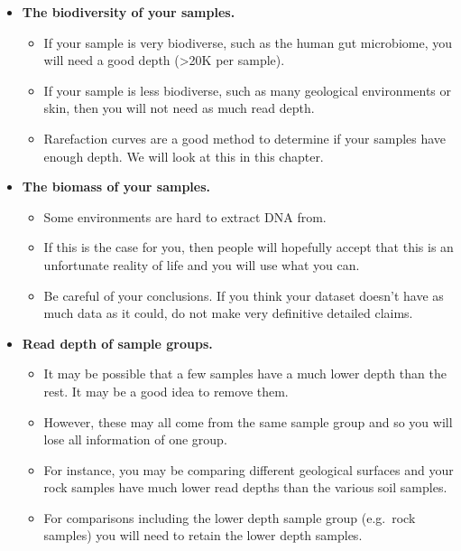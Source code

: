 \documentclass[
]{book}
\providecommand{\tightlist}{%
  \setlength{\itemsep}{0pt}\setlength{\parskip}{0pt}}
\begin{document}
\begin{itemize}
\tightlist
\item
  \textbf{The biodiversity of your samples.}

  \begin{itemize}
  \tightlist
  \item
    If your sample is very biodiverse, such as the human gut microbiome, you will need a good depth (\textgreater20K per sample).
  \item
    If your sample is less biodiverse, such as many geological environments or skin, then you will not need as much read depth.
  \item
    Rarefaction curves are a good method to determine if your samples have enough depth. We will look at this in this chapter.
  \end{itemize}
\item
  \textbf{The biomass of your samples.}

  \begin{itemize}
  \tightlist
  \item
    Some environments are hard to extract DNA from.
  \item
    If this is the case for you, then people will hopefully accept that this is an unfortunate reality of life and you will use what you can.
  \item
    Be careful of your conclusions. If you think your dataset doesn't have as much data as it could, do not make very definitive detailed claims.
  \end{itemize}
\item
  \textbf{Read depth of sample groups.}

  \begin{itemize}
  \tightlist
  \item
    It may be possible that a few samples have a much lower depth than the rest. It may be a good idea to remove them.
  \item
    However, these may all come from the same sample group and so you will lose all information of one group.
  \item
    For instance, you may be comparing different geological surfaces and your rock samples have much lower read depths than the various soil samples.
  \item
    For comparisons including the lower depth sample group (e.g.~rock samples) you will need to retain the lower depth samples.
  \end{itemize}
\end{itemize}
\end{document}
